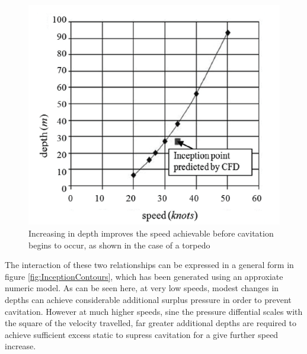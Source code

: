 \documentclass{article}\usepackage[]{graphicx}\usepackage[]{color}
\begin{document}
\begin{figure}
\includegraphics[width=\textwidth]{InceptionDepth.png}
\caption{Increasing in depth improves the speed achievable before cavitation begins to occur, as shown in the case of a torpedo \parencite{suryanarayana2010cavitation}}
\label{fig:InceptionDepth.png}
\end{figure}

The interaction of these two relationships can be expressed in a general form in figure \ref{fig:InceptionContours}, which has been generated using an approxiate numeric model. As can be seen here, at very low speeds, modest changes in depths can achieve considerable additional surplus pressure in order to prevent cavitation.  However at much higher speeds, sine the pressure diffential scales with the square of the velocity travelled, far greater additional depths are required to achieve sufficient excess static to supress cavitation for a give further speed increase.
\end{document}
